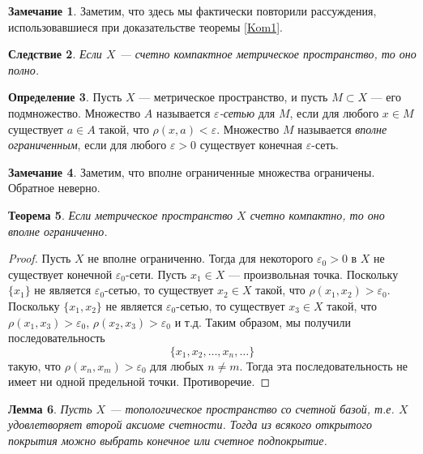 \documentclass[12pt, titlepage, oneside]{amsbook}
\newtheorem{theorem}{Теорема}[chapter]
\newtheorem{lemma}[theorem]{Лемма}
\newtheorem{corollary}[theorem]{Следствие}
\theoremstyle{definition}
\newtheorem{definition}[theorem]{Определение}
\newtheorem{remark}[theorem]{Замечание}
\theoremstyle{remark}
\begin{document}
\begin{remark}
	Заметим, что здесь мы фактически повторили рассуждения, использовавшиеся при доказательстве теоремы \ref{Kom1}.
\end{remark}

\begin{corollary}
	\label{Kom5-1}
	Если $X$ --- счетно компактное метрическое пространство, то оно полно.
\end{corollary}

\begin{definition}
	Пусть $X$ --- метрическое пространство, и пусть $M\subset X$ --- его подмножество. Множество $A$ называется \emph{$\varepsilon$-сетью} для $M$, если для любого $x\in M$ существует $a\in A$ такой, что $\rho(x,a)<\varepsilon$. Множество $M$ называется \emph{вполне ограниченным}, если для любого $\varepsilon>0$ существует конечная $\varepsilon$-сеть.
\end{definition}

\begin{remark}
	Заметим, что вполне ограниченные множества ограничены. Обратное неверно.
\end{remark}


\begin{theorem}
	\label{Kom6}
	Если метрическое пространство $X$ счетно компактно, то оно вполне ограниченно.
\end{theorem}

\begin{proof}
	Пусть $X$ не вполне ограниченно. Тогда для некоторого $\varepsilon_0>0$ в $X$ не существует конечной $\varepsilon_0$-сети. Пусть $x_1\in X$ --- произвольная точка. Поскольку $\{x_1\}$ не является $\varepsilon_0$-сетью, то существует $x_2\in X$ такой, что $\rho(x_1,x_2)>\varepsilon_0$. Поскольку $\{x_1,x_2\}$ не является $\varepsilon_0$-сетью, то существует $x_3\in X$ такой, что $\rho(x_1,x_3)>\varepsilon_0$, $\rho(x_2,x_3)>\varepsilon_0$ и т.д. Таким образом, мы получили последовательность $$\{x_1,x_2,\ldots,x_n,\ldots\}$$ такую, что $\rho(x_n,x_m)>\varepsilon_0$ для любых $n\neq m$. Тогда эта последовательность не имеет ни одной предельной точки. Противоречие.
\end{proof}

\begin{lemma}
	\label{LemKom}
	Пусть $X$ --- топологическое пространство со счетной базой, т.е. $X$ удовлетворяет второй аксиоме счетности. Тогда из всякого открытого покрытия можно выбрать конечное или счетное подпокрытие.
\end{lemma}
\end{document}
